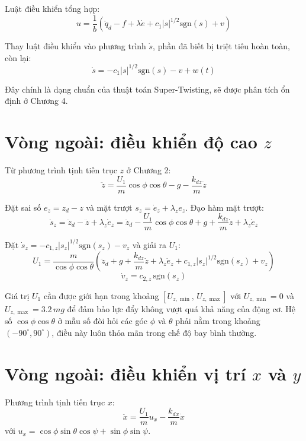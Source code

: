 \documentclass[12pt,a4paper]{report}
\begin{document}
Luật điều khiển tổng hợp:
\begin{equation}
u = \frac{1}{b} \left( \ddot{q}_d - f + \lambda \dot{e} + c_1 |s|^{1/2} \text{sgn}(s) + v \right)
\end{equation}

Thay luật điều khiển vào phương trình $\dot{s}$, phần đã biết bị triệt tiêu hoàn toàn, còn lại:
\begin{equation}
\dot{s} = -c_1 |s|^{1/2} \text{sgn}(s) - v + w(t)
\end{equation}

Đây chính là dạng chuẩn của thuật toán Super-Twisting, sẽ được phân tích ổn định ở Chương 4.

\section{Vòng ngoài: điều khiển độ cao $z$}
Từ phương trình tịnh tiến trục $z$ ở Chương 2:
\begin{equation}
\ddot{z} = \frac{U_1}{m} \cos\phi \cos\theta - g - \frac{k_{dz}}{m} \dot{z}
\end{equation}

Đặt sai số $e_z = z_d - z$ và mặt trượt $s_z = \dot{e}_z + \lambda_z e_z$. Đạo hàm mặt trượt:
\begin{equation}
\dot{s}_z = \ddot{z}_d - \ddot{z} + \lambda_z \dot{e}_z
= \ddot{z}_d - \frac{U_1}{m} \cos\phi \cos\theta + g + \frac{k_{dz}}{m} \dot{z} + \lambda_z \dot{e}_z
\end{equation}

Đặt $\dot{s}_z = -c_{1,z} |s_z|^{1/2} \text{sgn}(s_z) - v_z$ và giải ra $U_1$:
\begin{equation}
U_1 = \frac{m}{\cos\phi \cos\theta} \left( \ddot{z}_d + g + \frac{k_{dz}}{m} \dot{z} + \lambda_z \dot{e}_z + c_{1,z} |s_z|^{1/2} \text{sgn}(s_z) + v_z \right)
\end{equation}
\begin{equation}
\dot{v}_z = c_{2,z} \, \text{sgn}(s_z)
\end{equation}

Giá trị $U_1$ cần được giới hạn trong khoảng $[U_{z,\min}, \, U_{z,\max}]$ với $U_{z,\min} = 0$ và $U_{z,\max} = 3.2 \, mg$ để đảm bảo lực đẩy không vượt quá khả năng của động cơ. Hệ số $\cos\phi \cos\theta$ ở mẫu số đòi hỏi các góc $\phi$ và $\theta$ phải nằm trong khoảng $(-90^\circ, 90^\circ)$, điều này luôn thỏa mãn trong chế độ bay bình thường.

\section{Vòng ngoài: điều khiển vị trí $x$ và $y$}
Phương trình tịnh tiến trục $x$:
\begin{equation}
\ddot{x} = \frac{U_1}{m} u_x - \frac{k_{dx}}{m} \dot{x}
\end{equation}
với $u_x = \cos\phi \sin\theta \cos\psi + \sin\phi \sin\psi$.
\end{document}
